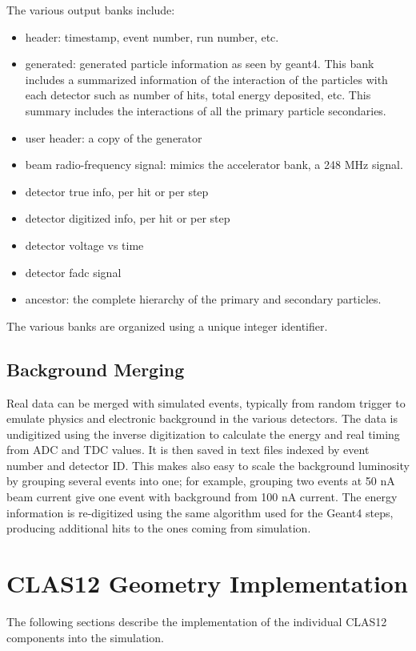 The various output banks include:

\begin{itemize}
	\item header: timestamp, event number, run number, etc.
	\item generated: generated particle information as seen by geant4. This bank includes a summarized information of the interaction of
                     the particles with each detector such as number of hits, total energy deposited, etc. This summary includes
                     the interactions of all the primary particle secondaries.
	\item user header: a copy of the generator
	\item beam radio-frequency signal: mimics the accelerator bank, a 248 MHz signal.
	\item detector true info, per hit or per step
	\item detector digitized info, per hit or per step
	\item detector voltage vs time
	\item detector fadc signal
\item ancestor: the complete hierarchy of the primary and secondary particles.
\end{itemize}

The various banks are organized using a unique integer identifier.

\subsection{Background Merging}

Real data can be merged with simulated events, typically from random trigger to emulate physics and electronic background in
the various detectors.
The data is un\-digitized using the inverse digitization to calculate the energy and real timing from ADC and TDC values.
It is then saved in text files indexed by event number and detector ID. This makes also easy to scale the background luminosity by grouping
several events into one; for example, grouping two events at 50 nA beam current give one event with background from 100 nA current.
The energy information is re-digitized using the same algorithm used for the Geant4 steps, producing additional hits to the ones coming from simulation.



\section{CLAS12 Geometry Implementation}

The following sections describe the implementation of the individual CLAS12 components into the simulation.
